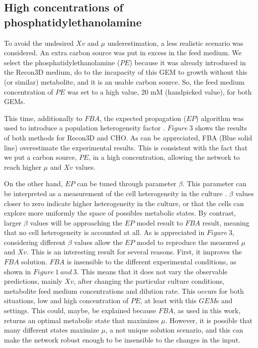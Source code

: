 \subsection{High concentrations of phosphatidylethanolamine}

	To avoid the undesired $Xv$ and $\mu$ underestimation, a less realistic scenario was considered. An extra carbon source was put in excess in the feed medium. We select the phosphatidylethanolamine ($PE$) because it was already introduced in the Recon3D medium, do to the incapacity of this GEM to growth without this (or similar) metabolite, and it is an usable carbon source. So, the feed medium concentration of	$PE$ was set to a high value, 20 mM (handpicked value), for both GEMs. 
 	
 	This time, additionally to $FBA$, the expected propagation ($EP$) algorithm was used to introduce a population heterogeneity factor \cite{Fernandez-de-Cossio-Diaz2018b}. $Figure\ 3$ shows the results of both methods for Recon3D and CHO. As can be appreciated, FBA (Blue solid line) overestimate the experimental results. This is consistent with the fact that we put a carbon source, $PE$, in a high concentration, allowing the network to reach higher $\mu$ and $Xv$ values.
 	
  	On the other hand, $EP$ can be tuned through parameter $\beta$. This parameter can be interpreted as a measurement of the cell heterogeneity in the culture \cite{Fernandez-de-Cossio-Diaz2018b}. $\beta$ values closer to zero indicate higher heterogeneity in the culture, or that the cells can explore more uniformly the space of possibles metabolic states. By contrast, larger $\beta$ values will be approaching the $EP$ model result to $FBA$ result, meaning that no cell heterogeneity is accounted at all. As is appreciated in $Figure\ 3$, considering different $\beta$ values allow the $EP$ model to reproduce the measured $\mu$ and $Xv$. This is an interesting result for several reasons. First, it improves the $FBA$ solution. $FBA$ is insensible to the different experimental conditions, as shown in $Figure\ 1\ and\ 3$. This means that it does not vary the observable predictions, mainly $Xv$, after changing the particular culture conditions, metabolite feed medium concentrations and dilution rate. This occurs for both situations, low and high concentration of $PE$, at least with this $GEM$s and settings. This could, maybe, be explained because $FBA$, as used in this work, returns an optimal metabolic state that maximizes $\mu$. However, it is possible that many different states maximize $\mu$, a not unique solution scenario, and this can make the network robust enough to be insensible to the changes in the input. 
  	

